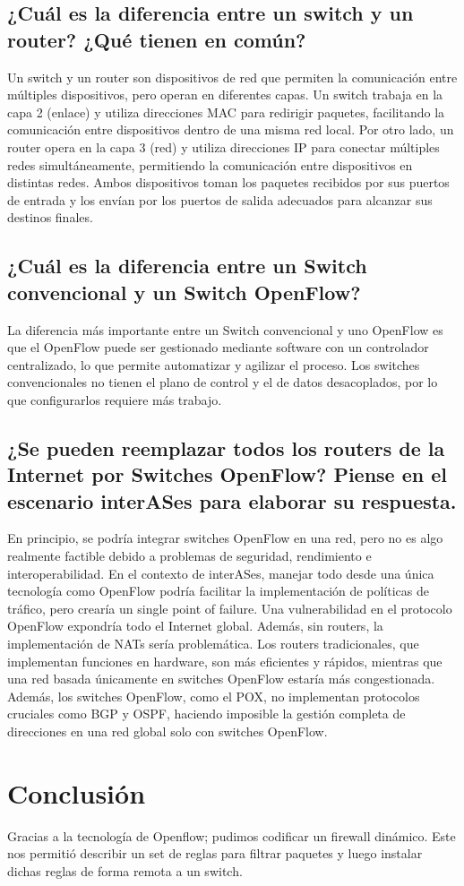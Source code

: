 \documentclass{article}
\begin{document}
\subsection{¿Cuál es la diferencia entre un switch y un router? ¿Qué tienen en común?}
Un switch y un router son dispositivos de red que permiten la comunicación entre múltiples dispositivos, pero operan en diferentes capas. Un switch trabaja en la capa 2 (enlace) y utiliza direcciones MAC para redirigir paquetes, facilitando la comunicación entre dispositivos dentro de una misma red local. Por otro lado, un router opera en la capa 3 (red) y utiliza direcciones IP para conectar múltiples redes simultáneamente, permitiendo la comunicación entre dispositivos en distintas redes. Ambos dispositivos toman los paquetes recibidos por sus puertos de entrada y los envían por los puertos de salida adecuados para alcanzar sus destinos finales.


\subsection{¿Cuál es la diferencia entre un Switch convencional y un Switch OpenFlow?}
La diferencia más importante entre un Switch convencional y uno OpenFlow es que el OpenFlow puede ser gestionado mediante software con un controlador centralizado, lo que permite automatizar y agilizar el proceso. Los switches convencionales no tienen el plano de control y el de datos desacoplados, por lo que configurarlos requiere más trabajo.


\subsection{¿Se pueden reemplazar todos los routers de la Internet por Switches OpenFlow? Piense en el escenario interASes para elaborar su respuesta.}
En principio, se podría integrar switches OpenFlow en una red, pero no es algo realmente factible debido a problemas de seguridad, rendimiento e interoperabilidad. En el contexto de interASes, manejar todo desde una única tecnología como OpenFlow podría facilitar la implementación de políticas de tráfico, pero crearía un single point of failure. Una vulnerabilidad en el protocolo OpenFlow expondría todo el Internet global. Además, sin routers, la implementación de NATs sería problemática. Los routers tradicionales, que implementan funciones en hardware, son más eficientes y rápidos, mientras que una red basada únicamente en switches OpenFlow estaría más congestionada. Además, los switches OpenFlow, como el POX, no implementan protocolos cruciales como BGP y OSPF, haciendo imposible la gestión completa de direcciones en una red global solo con switches OpenFlow.


\section{Conclusión}
Gracias a la tecnología de Openflow; pudimos codificar un firewall dinámico. Este nos permitió describir un set de reglas para filtrar paquetes y luego instalar dichas reglas de forma remota a un switch.
\end{document}
